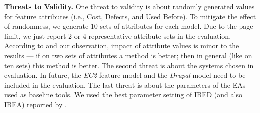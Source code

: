 

\noindent\textbf{Threats to Validity.}
One threat to validity is about randomly generated values for feature attributes (i.e.,  Cost,  Defects,  and  Used  Before). %
To  mitigate  the  effect  of  randomness, we  generate  10  sets  of  attributes for each model. Due to the page limit, we just report 2 or 4 representative attribute sets in the evaluation. According to \cite{DBLP:journals/asc/XueZT0CC016} and our observation, impact of attribute values is minor to the results ---  if on two sets of attributes a method is better; then in general (like on ten sets) this method is better. %
The second threat is about the systems chosen in evaluation. In future, the \emph{EC2}  feature  model \cite{DBLP:journals/fgcs/Garcia-GalanTRC16} and  the  \emph{Drupal} model  \cite{Sanchez2015} need to be included in the evaluation. The last threat is about the parameters of the EAs used as baseline tools. We used the best parameter setting of IBED (and also IBEA) reported by \cite{DBLP:journals/asc/XueZT0CC016}.

\vspace{-2mm}
